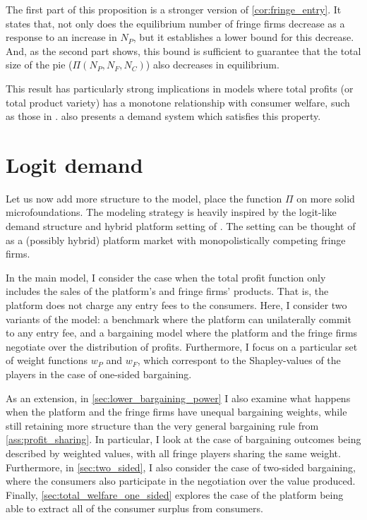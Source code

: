 \documentclass[a4paper]{article}
\begin{document}
The first part of this proposition is a stronger version of \cref{cor:fringe_entry}.
It states that, not only does the equilibrium number of fringe firms decrease as a response to an increase in $N_P$, but it establishes a lower bound for this decrease.
And, as the second part shows, this bound is sufficient to guarantee that the total size of the pie ($\Pi(N_P, N_F, N_C)$) also decreases in equilibrium.

This result has particularly strong implications in models where total profits (or total product variety) has a monotone relationship with consumer welfare, such as those in \textcite{anderson2020aggregative}.
 also presents a demand system which satisfies this property.


\section{Logit demand}
\label{sec:example}

Let us now add more structure to the model, place the function $\Pi$ on more solid microfoundations.
The modeling strategy is heavily inspired by the logit-like demand structure and hybrid platform setting of \textcite{anderson2021hybrid}.
The setting can be thought of as a (possibly hybrid) platform market with monopolistically competing fringe firms.

In the main model, I consider the case when the total profit function only includes the sales of the platform's and fringe firms' products.
That is, the platform does not charge any entry fees to the consumers.
Here, I consider two variants of the model: a benchmark where the platform can unilaterally commit to any entry fee, and a bargaining model where the platform and the fringe firms negotiate over the distribution of profits.
Furthermore, I focus on a particular set of weight functions $w_P$ and $w_F$, which correspont to the Shapley-values of the players in the case of one-sided bargaining.

As an extension, in \cref{sec:lower_bargaining_power} I also examine what happens when the platform and the fringe firms have unequal bargaining weights, while still retaining more structure than the very general bargaining rule from \cref{ass:profit_sharing}.
In particular, I look at the case of bargaining outcomes being described by weighted values, with all fringe players sharing the same weight.
Furthermore, in \cref{sec:two_sided}, I also consider the case of two-sided bargaining, where the consumers also participate in the negotiation over the value produced.
Finally, \cref{sec:total_welfare_one_sided} explores the case of the platform being able to extract all of the consumer surplus from consumers.
\end{document}
